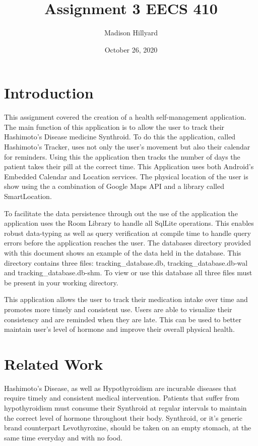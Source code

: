 \documentclass{article}
\title{Assignment 3 EECS 410}
\author{Madison Hillyard }
\date{October 26, 2020}
\begin{document}
\maketitle

\section{Introduction}
This assignment covered the creation of a health self-management application. The main function of this application is to allow the user to track their Hashimoto's Disease medicine Synthroid. To do this the application, called Hashimoto's Tracker, uses not only the user's movement but also their calendar for reminders. Using this the application then tracks the number of days the patient takes their pill at the correct time. This Application uses both Android's Embedded Calendar \citep{AndroidCalendar} and Location \citep{SmartLocation} services. The physical location of the user is show using the a combination of Google Maps API\citep{GoogleMaps} and a library called SmartLocation\citep{SmartLocation}.

To facilitate the data persistence through out the use of the application the application uses the Room Library to handle all SqlLite operations. This enables robust data-typing as well as query verification at compile time to handle query errors before the application reaches the user. The databases directory provided with this document shows an example of the data held in the database. This directory contains three files: tracking\_database.db, tracking\_database.db-wal and tracking\_database.db-shm. To view or use this database all three files must be present in your working directory.

This application allows the user to track their medication intake over time and promotes more timely and consistent use. Users are able to visualize their consistency and are reminded when they are late.  This can be used to better maintain user's level of hormone and improve their overall physical health.

\section{Related Work}
Hashimoto's Disease, as well as Hypothyroidism are incurable diseases that require timely and consistent medical intervention. Patients that suffer from hypothyroidism must consume their Synthroid at regular intervals to maintain the correct level of hormone throughout their body. Synthroid, or it's generic brand counterpart Levothyroxine, should be taken on an empty stomach, at the same time everyday and with no food. 
\end{document}
